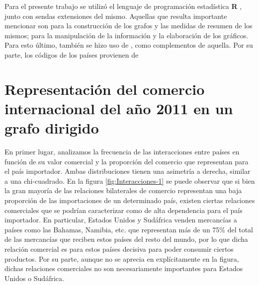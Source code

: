 \documentclass[runningheads,a4paper]{llncs}
\begin{document}
Para el presente trabajo se utilizó el lenguaje de programación estadística \textbf{R} \cite{RCoreTeam2017}, junto con sendas extensiones del mismo. Aquellas que resulta importante mencionar son \cite{Csardi2006} para la construcción de los grafos y las medidas de resumen de los mismos; \cite{Wickham2017} para la manipulación de la información y la elaboración de los gráficos. Para esto último, también se hizo uso de  \cite{Wilke2017,Arnold2017,Neuwirth2014,Slowikowski2017,Vu2011}, como complementos de aquella. Por su parte, los códigos de los países provienen de \cite{Arel-Bundock2017}


\section{Representación del comercio internacional del año 2011 en un grafo dirigido}

En primer lugar, analizamos la frecuencia de las interacciones entre países en función de su valor comercial y la proporción del comercio que representan para el país importador. Ambas distribuciones tienen una asimetría a derecha, similar a una chi-cuadrado. En la figura \ref{fig:Interacciones-1} se puede observar que si bien la gran mayoría de las relaciones bilaterales de comercio representan una baja proporción de las importaciones de un determinado país, existen ciertas relaciones comerciales que se podrían caracterizar como de alta dependencia para el país importador. En particular, Estados Unidos y Sudáfrica venden mercancías a países como las Bahamas, Namibia, etc. que representan más de un 75\% del total de las mercancías que reciben estos países del resto del mundo, por lo que dicha relación comercial es para estos países decisiva para poder consumir ciertos productos. Por su parte, aunque no se aprecia en explícitamente en la figura, dichas relaciones comerciales no son necesariamente importantes para Estados Unidos o Sudáfrica.
\end{document}
